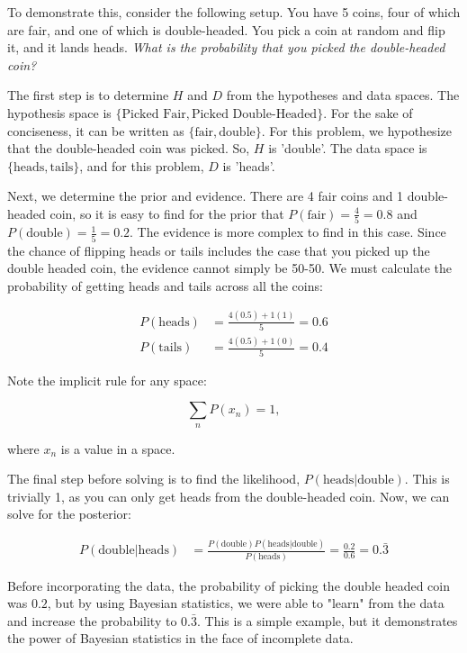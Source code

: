 \documentclass[preprint,longauthor]{aastex631}
\numberwithin{equation}{section}
\begin{document}
To demonstrate this, consider the following setup. You have 5 coins, four of which are fair, and one of which is double-headed. You pick a coin at random and flip it, and it lands heads. \textit{What is the probability that you picked the double-headed coin?}

The first step is to determine $H$ and $D$ from the hypotheses and data spaces. The hypothesis space is $\{\text{Picked Fair},\text{Picked Double-Headed}\}$. For the sake of conciseness, it can be written as $\{\text{fair},\text{double}\}$. For this problem, we hypothesize that the double-headed coin was picked. So, $H$ is 'double'. The data space is $\{\text{heads},\text{tails}\}$, and for this problem, $D$ is 'heads'.

Next, we determine the prior and evidence. There are 4 fair coins and 1 double-headed coin, so it is easy to find for the prior that $P(\text{fair}) = \frac{4}{5} = 0.8$ and $P(\text{double}) = \frac{1}{5} = 0.2$. The evidence is more complex to find in this case. Since the chance of flipping heads or tails includes the case that you picked up the double headed coin, the evidence cannot simply be 50-50. We must calculate the probability of getting heads and tails across all the coins:

\begin{align*}
  P(\text{heads}) &= \frac{4(0.5)+1(1)}{5} = 0.6 \\
  P(\text{tails}) &= \frac{4(0.5)+1(0)}{5} = 0.4
\end{align*}

Note the implicit rule for any space:

\begin{equation}
  \sum_n P(x_n) = 1,
\end{equation}

where $x_n$ is a value in a space.

The final step before solving is to find the likelihood, $P(\text{heads}|\text{double})$. This is trivially 1, as you can only get heads from the double-headed coin. Now, we can solve for the posterior:

\begin{align*}
  P(\text{double}|\text{heads}) &= \frac{P(\text{double})P(\text{heads}|\text{double})}{P(\text{heads})} = \frac{0.2}{0.6} = \boxed{0.\bar{3}}
\end{align*}

Before incorporating the data, the probability of picking the double headed coin was $0.2$, but by using Bayesian statistics, we were able to "learn" from the data and increase the probability to $0.\bar{3}$. This is a simple example, but it demonstrates the power of Bayesian statistics in the face of incomplete data.
\end{document}

